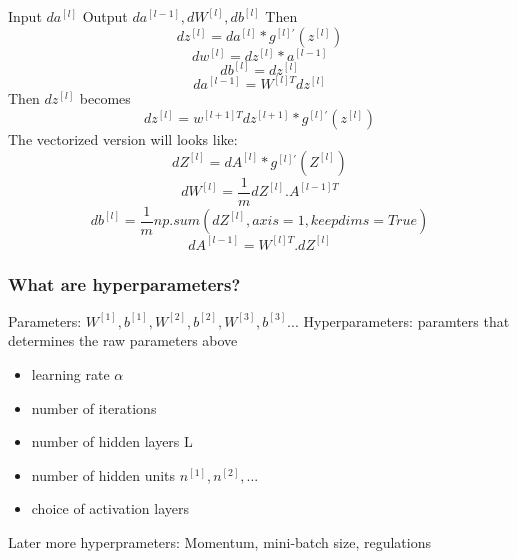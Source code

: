 Input $da^{[l]}$
Output $da^{[l-1]}, dW^{[l]}, db^{[l]}$
Then
\begin{equation}
dz^{[l]} = da^{[l]} * g^{[l]'}(z^{[l]})
\end{equation}
\begin{equation}
dw^{[l]} = dz^{[l]} * a^{[l-1]}
\end{equation}
\begin{equation}
db^{[l]} = dz^{[l]}
\end{equation}
\begin{equation}
da^{[l-1]} = W^{[l]T} dz^{[l]}
\end{equation}
Then $dz^{[l]}$ becomes
\begin{equation}
dz^{[l]} = w^{[l+1]T} dz^{[l+1]} * g^{[l]'}(z^{[l]})
\end{equation}
The vectorized version will looks like:
\begin{equation}
dZ^{[l]} = dA^{[l]} * g^{[l]'}(Z^{[l]})
\end{equation}
\begin{equation}
dW^{[l]} = \frac{1}{m} dZ^{[l]} . A^{[l-1]T}
\end{equation}
\begin{equation}
db^{[l]} = \frac{1}{m} np.sum(dZ^{[l]}, axis = 1, keepdims = True)
\end{equation}
\begin{equation}
dA^{[l-1]} = W^{[l]T} . dZ^{[l]}
\end{equation}


\subsubsection*{What are hyperparameters?}

Parameters: $W^{[1]}, b^{[1]}, W^{[2]}, b^{[2]}, W^{[3]}, b^{[3]} ...$
Hyperparameters: paramters that determines the raw parameters above
\begin{itemize}
    \item learning rate $\alpha$
    \item number of iterations
    \item number of hidden layers L
    \item number of hidden units $n^{[1]}, n^{[2]}, ...$
    \item choice of activation layers
\end{itemize}

Later more hyperprameters: Momentum, mini-batch size, regulations


